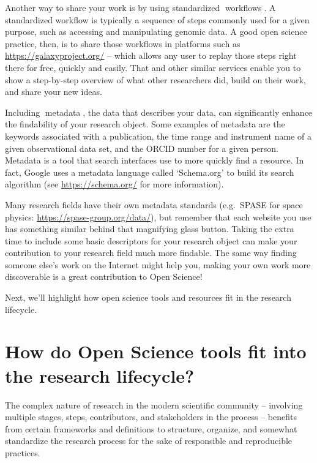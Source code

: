 \documentclass[
  letterpaper,
  DIV=11,
  numbers=noendperiod]{scrreport}
\begin{document}
Another way to share your work is by using standardized
{📖}workflows{📖}. A standardized workflow is typically a sequence of
steps commonly used for a given purpose, such as accessing and
manipulating genomic data. A good open science practice, then, is to
share those workflows in platforms such as
\url{https://galaxyproject.org/} -- which allows any user to replay
those steps right there for free, quickly and easily. That and other
similar services enable you to show a step-by-step overview of what
other researchers did, build on their work, and share your new ideas.

Including {📖}metadata{📖}, the data that describes your data, can
significantly enhance the findability of your research object. Some
examples of metadata are the keywords associated with a publication, the
time range and instrument name of a given observational data set, and
the ORCID number for a given person. Metadata is a tool that search
interfaces use to more quickly find a resource. In fact, Google uses a
metadata language called `Schema.org' to build its search algorithm (see
\url{https://schema.org/} for more information).

Many research fields have their own metadata standards (e.g.~SPASE for
space physics: \url{https://spase-group.org/data/}), but remember that
each website you use has something similar behind that magnifying glass
button. Taking the extra time to include some basic descriptors for your
research object can make your contribution to your research field much
more findable. The same way finding someone else's work on the Internet
might help you, making your own work more discoverable is a great
contribution to Open Science!

Next, we'll highlight how open science tools and resources fit in the
research lifecycle.

\hypertarget{how-do-open-science-tools-fit-into-the-research-lifecycle}{%
\section*{How do Open Science tools fit into the research
lifecycle?}\label{how-do-open-science-tools-fit-into-the-research-lifecycle}}


The complex nature of research in the modern scientific community --
involving multiple stages, steps, contributors, and stakeholders in the
process -- benefits from certain frameworks and definitions to
structure, organize, and somewhat standardize the research process for
the sake of responsible and reproducible practices.
\end{document}

